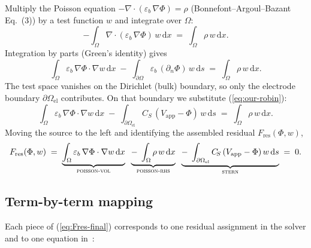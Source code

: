 \documentclass[11pt]{article}
\newcommand{\CS}{C_{\!S}}
\newcommand{\dd}{\mathrm{d}}
\newcommand{\eb}{\varepsilon_{b}}
\begin{document}
Multiply the Poisson equation $-\nabla\!\cdot\!(\eb\,\nabla\Phi)=\rho$
(Bonnefont--Argoul--Bazant Eq.~(3)) by a test function $w$ and
integrate over $\Omega$:
\begin{equation}
-\!\int_{\Omega} \nabla\!\cdot\!(\eb\,\nabla\Phi)\,w\,\dd x
\;=\;\int_{\Omega}\rho\,w\,\dd x.
\label{eq:poisson-weak0}
\end{equation}
Integration by parts (Green's identity) gives
\begin{equation}
\int_{\Omega}\eb\,\nabla\Phi\cdot\nabla w\,\dd x
\;-\;\int_{\partial\Omega}\eb\,(\partial_{n}\Phi)\,w\,\dd s
\;=\;\int_{\Omega}\rho\,w\,\dd x.
\label{eq:poisson-weak-ibp}
\end{equation}
The test space vanishes on the Dirichlet (bulk) boundary, so only the
electrode boundary $\partial\Omega_{\mathrm{el}}$ contributes. On that
boundary we substitute (\ref{eq:our-robin}):
\begin{equation}
\int_{\Omega}\eb\,\nabla\Phi\cdot\nabla w\,\dd x
\;-\;\int_{\partial\Omega_{\mathrm{el}}}
\CS\,(V_{\mathrm{app}}-\Phi)\,w\,\dd s
\;=\;\int_{\Omega}\rho\,w\,\dd x.
\label{eq:poisson-after-robin}
\end{equation}
Moving the source to the left and identifying the assembled residual
$F_{\mathrm{res}}(\Phi,w)$,
\begin{equation}
F_{\mathrm{res}}(\Phi,w)\;=\;
\underbrace{\int_{\Omega}\eb\,\nabla\Phi\cdot\nabla w\,\dd x}_{\textsc{poisson-vol}}
\;\;\underbrace{-\;\int_{\Omega}\rho\,w\,\dd x}_{\textsc{poisson-rhs}}
\;\;\underbrace{-\;\int_{\partial\Omega_{\mathrm{el}}}\CS\,(V_{\mathrm{app}}-\Phi)\,w\,\dd s}_{\textsc{stern}}
\;=\;0.
\label{eq:Fres-final}
\end{equation}

\subsection*{Term-by-term mapping}

Each piece of (\ref{eq:Fres-final}) corresponds to one residual
assignment in the solver and to one equation in~\cite{bonnefont2001}:
\end{document}
